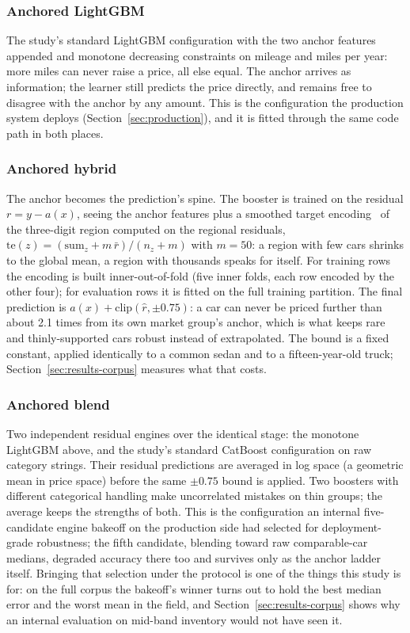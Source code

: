 \documentclass[journal,10pt]{IEEEtran}
\begin{document}
\subsubsection{Anchored LightGBM} The study's standard LightGBM configuration with the two anchor features appended and monotone decreasing constraints on mileage and miles per year: more miles can never raise a price, all else equal. The anchor arrives as information; the learner still predicts the price directly, and remains free to disagree with the anchor by any amount. This is the configuration the production system deploys (Section~\ref{sec:production}), and it is fitted through the same code path in both places.

\subsubsection{Anchored hybrid} The anchor becomes the prediction's spine. The booster is trained on the residual $r = y - a(x)$, seeing the anchor features plus a smoothed target encoding~\cite{micci2001} of the three-digit region computed on the regional residuals, $\mathrm{te}(z) = (\mathrm{sum}_z + m\,\bar{r})/(n_z + m)$ with $m{=}50$: a region with few cars shrinks to the global mean, a region with thousands speaks for itself. For training rows the encoding is built inner-out-of-fold (five inner folds, each row encoded by the other four); for evaluation rows it is fitted on the full training partition. The final prediction is $a(x) + \mathrm{clip}(\hat{r}, \pm 0.75)$: a car can never be priced further than about 2.1 times from its own market group's anchor, which is what keeps rare and thinly-supported cars robust instead of extrapolated. The bound is a fixed constant, applied identically to a common sedan and to a fifteen-year-old truck; Section~\ref{sec:results-corpus} measures what that costs.

\subsubsection{Anchored blend} Two independent residual engines over the identical stage: the monotone LightGBM above, and the study's standard CatBoost configuration on raw category strings. Their residual predictions are averaged in log space (a geometric mean in price space) before the same $\pm 0.75$ bound is applied. Two boosters with different categorical handling make uncorrelated mistakes on thin groups; the average keeps the strengths of both. This is the configuration an internal five-candidate engine bakeoff on the production side had selected for deployment-grade robustness; the fifth candidate, blending toward raw comparable-car medians, degraded accuracy there too and survives only as the anchor ladder itself. Bringing that selection under the protocol is one of the things this study is for: on the full corpus the bakeoff's winner turns out to hold the best median error and the worst mean in the field, and Section~\ref{sec:results-corpus} shows why an internal evaluation on mid-band inventory would not have seen it.
\end{document}

